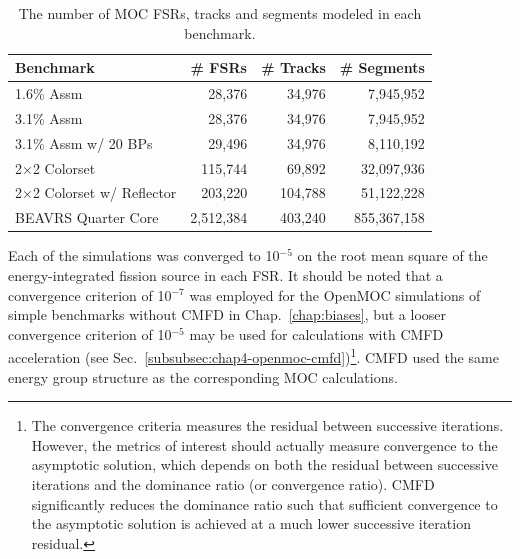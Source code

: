 \begin{table}[h!]
  \centering
  \caption[Number of \ac{FSR}s, tracks and segments for each heterogeneous benchmark]{The number of \ac{MOC} \ac{FSR}s, tracks and segments modeled in each benchmark.}
  \small
  \label{table:chap8-num-fsrs-tracks-segments}
  \vspace{6pt}
  \begin{tabular}{l r r r}
  \toprule
  \rowcolor{lightgray}
  \textbf{Benchmark} &
  \multicolumn{1}{c}{\cellcolor{lightgray} \textbf{\# \ac{FSR}s}} &
  \multicolumn{1}{c}{\cellcolor{lightgray} \textbf{\# Tracks}} &
  \multicolumn{1}{c}{\cellcolor{lightgray} \textbf{\# Segments}} \\
  \midrule
1.6\% Assm & 28,376 & 34,976 & 7,945,952 \\
  \midrule
3.1\% Assm & 28,376 & 34,976 & 7,945,952 \\
  \midrule
3.1\% Assm w/ 20 BPs & 29,496 & 34,976 & 8,110,192  \\
  \midrule
2$\times$2 Colorset & 115,744 & 69,892 & 32,097,936 \\
  \midrule
2$\times$2 Colorset w/ Reflector & 203,220 & 104,788 & 51,122,228 \\
  \midrule
\ac{BEAVRS} Quarter Core & 2,512,384 & 403,240 & 855,367,158 \\
  \bottomrule
\end{tabular}
\end{table}

Each of the simulations was converged to 10$^{-5}$ on the root mean square of the energy-integrated fission source in each \ac{FSR}. It should be noted that a convergence criterion of 10$^{-7}$ was employed for the OpenMOC simulations of simple benchmarks without \ac{CMFD} in Chap.~\ref{chap:biases}, but a looser convergence criterion of 10$^{-5}$ may be used for calculations with \ac{CMFD} acceleration (see Sec.~\ref{subsubsec:chap4-openmoc-cmfd})\footnote{The convergence criteria measures the residual between successive iterations. However, the metrics of interest should actually measure convergence to the asymptotic solution, which depends on both the residual between successive iterations and the dominance ratio (or convergence ratio). \ac{CMFD} significantly reduces the dominance ratio such that sufficient convergence to the asymptotic solution is achieved at a much lower successive iteration residual.}. \ac{CMFD} used the same energy group structure as the corresponding \ac{MOC} calculations.

